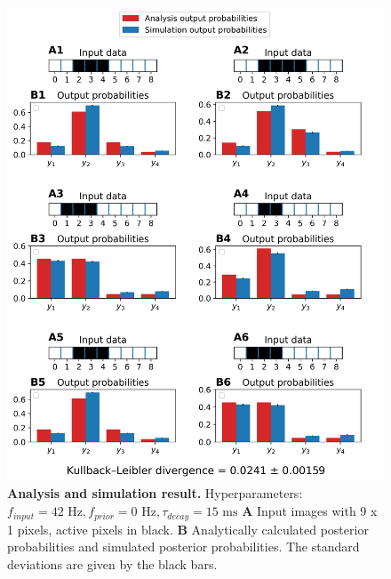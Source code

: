 \begin{figure}
  \includegraphics[width=\linewidth]{figures/1D/1D_42_0_15.png}
  \caption{\textbf{Analysis and simulation result. } Hyperparameters: $f_{input} = 42\text{ Hz}, f_{prior} = 0\text{ Hz}, \tau_{decay} = 15\text{ ms}$ \textbf{A} Input images with 9 x 1 pixels, active pixels in black. \textbf{B} Analytically calculated posterior probabilities and simulated posterior probabilities. The standard deviations are given by the black bars.}
  \label{fig:1D_42_0_15}
\end{figure}

